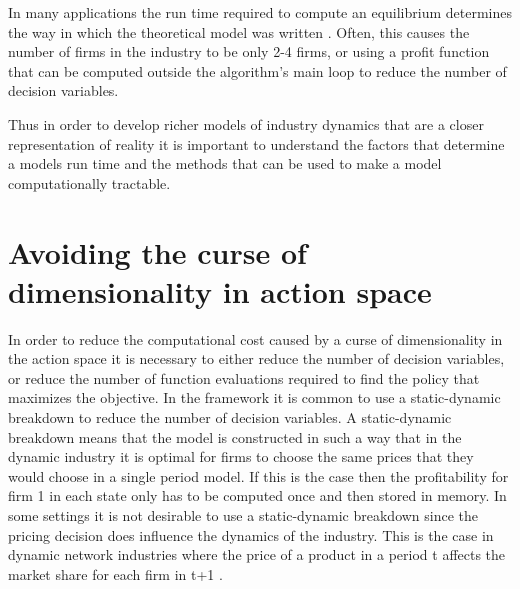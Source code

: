 \documentclass[12pt]{article}
\begin{document}
In many applications the run time required to compute an equilibrium determines the way in which the theoretical model was written \citep{2007_Doraszelski_Pakes, 2015_Benkard_Weintraub_Jeziorski_RAND}. Often, this causes the number of firms in the industry to be only 2-4 firms, or using a profit function that can be computed outside the algorithm's main loop to reduce the number of decision variables.

Thus in order to develop richer models of industry dynamics that are a closer representation of reality it is important to understand the factors that determine a models run time and the methods that can be used to make a model computationally tractable.

\section{Avoiding the curse of dimensionality in action space}
\label{action}

In order to reduce the computational cost caused by a curse of dimensionality in the action space it is necessary to either reduce the number of decision variables, or reduce the number of function evaluations required to find the policy that maximizes the objective. In the \citet{1995_Erickson_Pakes_RES} framework it is common to use a static-dynamic breakdown to reduce the number of decision variables. A static-dynamic breakdown means that the model is constructed in such a way that in the dynamic industry it is optimal for firms to choose the same prices that they would choose in a single period model. If this is the case then the profitability for firm 1 in each state only has to be computed once and then stored in memory. In some settings it is not desirable to use a static-dynamic breakdown since the pricing decision does influence the dynamics of the industry. This is the case in dynamic network industries where the price of a product in a period t affects the market share for each firm in t+1 \citep{2009_Chen_Doraszelski_Harrington, 2006_Mitchell_Skrzypacz, 2006_Chen_Doraszelski}.
\end{document}
